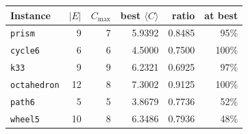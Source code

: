 \begin{tabular}{@{}lrrrrr@{}}
\toprule
Instance & $|E|$ & $C_{\max}$ & best $\langle C\rangle$ & ratio & at best\\
\midrule
\texttt{prism} & 9 & 7 & 5.9392 & 0.8485 & 95\%\\
\texttt{cycle6} & 6 & 6 & 4.5000 & 0.7500 & 100\%\\
\texttt{k33} & 9 & 9 & 6.2321 & 0.6925 & 97\%\\
\texttt{octahedron} & 12 & 8 & 7.3002 & 0.9125 & 100\%\\
\texttt{path6} & 5 & 5 & 3.8679 & 0.7736 & 52\%\\
\texttt{wheel5} & 10 & 8 & 6.3486 & 0.7936 & 48\%\\
\bottomrule
\end{tabular}

